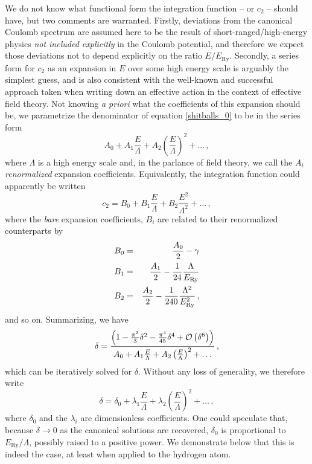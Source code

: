 \documentclass[pra,twocolumn,nofootinbib, superscriptaddress]{revtex4}%
\def\note#1{\tc{blue}{\bf (\emph{#1}) }}
\def\({\left(}
\def\){\right)}
\def\f#1#2{\frac{#1}{#2}}
\def\de{\delta}
\def\l{\lambda}
\def\L{\Lambda}
\def\p{\pi}
\def\tc#1#2{\textcolor{#1}{#2}}
\begin{document}
We do not know what functional form the integration function -- or $c_2$ -- should have, but two comments are warranted. Firstly, deviations from the canonical Coulomb spectrum are assumed here to be the result of short-ranged/high-energy physics \emph{not included explicitly} in the Coulomb potential, and therefore we expect those deviations not to depend explicitly on the ratio $E/E_\text{Ry}$. Secondly, a series form for $c_2$ as an expansion in $E$ over some high energy scale is arguably the simplest guess, and is also consistent with the well-known and successful approach taken when writing down an effective action in the context of effective field theory. Not knowing \emph{a priori} what the coefficients of this expansion should be, we parametrize the denominator of equation \eqref{shitballs_0} to be in the series form
\begin{equation}
A_0 + A_1 \f{E}{\L} + A_2 \(\f{E}{\L}\)^2 +\dots\,,
\end{equation}
where $\L$ is a high energy scale and, in the parlance of field theory, we call the $A_i$  \emph{renormalized} expansion coefficients. Equivalently, the integration function could apparently be written
\begin{equation}
c_2 =B_0 + B_1\f{E}{\L}+ B_2\f{E^2}{\L^2} +\dots\,,
\end{equation}
where the \emph{bare} expansion coefficients, $B_i$ are related to their renormalized counterparts by
\begin{eqnarray}
B_0&=&\f{A_0}{2}-\gamma\notag\\
B_1&=&\f{A_1}{2}  - \f{1}{24} \f{\L}{E_\text{Ry}}\notag\\
B_2&=&\f{A_2}{2} -\f{1}{240} \f{\L^2}{E_\text{Ry}^2}\,,
\end{eqnarray}
and so on. Summarizing, we have
\begin{equation}\label{delta_summary}
\de =     \f{\(1-\f{\p^2}{3}\de^2 -\f{\p^4}{45}\de^4  + {\cal O}\(\de^6\)\)}{A_0 + A_1 \f{E}{\L} + A_2 \(\f{E}{\L}\)^2 +\dots} \,, 
\end{equation}
which can be iteratively solved for $\de$. Without any loss of generality, we therefore write
\begin{equation}\label{generic_delta}
\de = \de_{0}+\l_{1} \f{E}{\L} + \l_{2} \(\f{E}{\L}\)^2 + \dots\,,
\end{equation}
where $\de_0$ and the $\l_i$ are dimensionless coefficients.  One could speculate that, because $\de\to0$ as the canonical solutions are recovered, $\de_0$ is proportional to  $E_\text{Ry}/\L$, possibly raised to a positive power. We demonstrate below that this is indeed the case, at least when applied to the hydrogen atom.%
\end{document}
